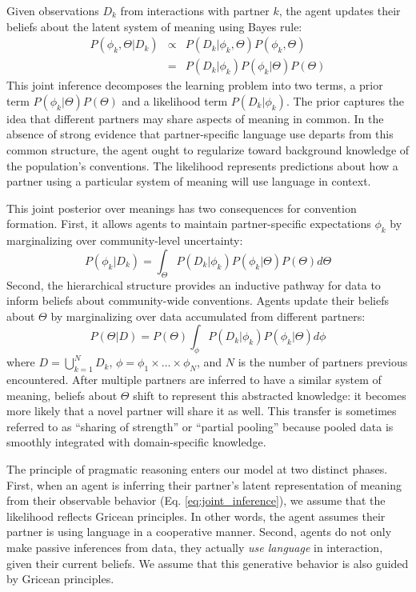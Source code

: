 Given observations $D_k$ from interactions with partner $k$, the agent updates their beliefs about the latent system of meaning using Bayes rule:
\begin{equation}
\begin{array}{rcl}
\label{eq:joint_inference}
P(\phi_k, \Theta | D_k)  & \propto &  P(D_k | \phi_k, \Theta) P(\phi_k, \Theta) \\
                           & =   & P(D_k | \phi_k) P(\phi_k | \Theta) P(\Theta)
\end{array}
\end{equation}
This joint inference decomposes the learning problem into two terms, a prior term $P(\phi_k | \Theta)P(\Theta)$ and a likelihood term $P(D_k | \phi_k)$.
The prior captures the idea that different partners may share aspects of meaning in common.
In the absence of strong evidence that partner-specific language use departs from this common structure, the agent ought to regularize toward background knowledge of the population's conventions.
The likelihood represents predictions about how a partner using a particular system of meaning will use language in context.

This joint posterior over meanings has two consequences for convention formation.
First, it allows agents to maintain partner-specific expectations $\phi_k$ by marginalizing over community-level uncertainty:
\begin{equation}
P(\phi_k | D_k) = \int_{\Theta}P(D_k | \phi_k) P(\phi_k | \Theta) P(\Theta)  d\Theta
\end{equation}
Second, the hierarchical structure provides an inductive pathway for data to inform beliefs about community-wide conventions.
Agents update their beliefs about $\Theta$ by marginalizing over data accumulated from different partners:
\begin{equation}
P(\Theta | D) = P(\Theta) \int_{\phi} P(D_k | \phi_k) P(\phi_k | \Theta) d\phi
\end{equation}
where $D = \bigcup_{k=1}^N D_k$, $\phi = \phi_1 \times \dots \times \phi_N$, and $N$ is the number of partners previous encountered. 
After multiple partners are inferred to have a similar system of meaning, beliefs about $\Theta$ shift to represent this abstracted knowledge: it becomes more likely that a novel partner will share it as well.
This transfer is sometimes referred to as ``sharing of strength'' or ``partial pooling'' because pooled data is smoothly integrated with domain-specific knowledge.

The principle of pragmatic reasoning enters our model at two distinct phases.
First, when an agent is inferring their partner's latent representation of meaning from their observable behavior (Eq. \ref{eq:joint_inference}), we assume that the likelihood reflects Gricean principles.
In other words, the agent assumes their partner is using language in a cooperative manner.
Second, agents do not only make passive inferences from data, they actually \emph{use language} in interaction, given their current beliefs.
We assume that this generative behavior is also guided by Gricean principles.

